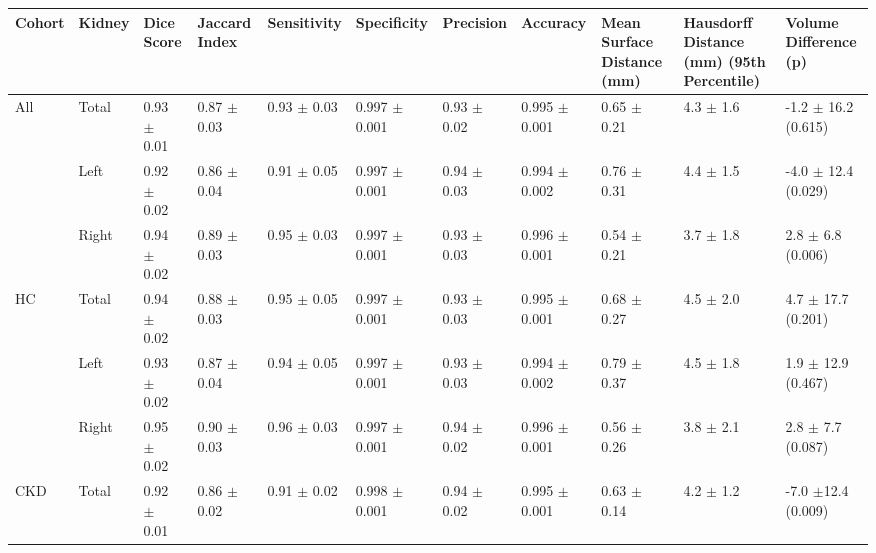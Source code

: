 \begin{landscape}
\begin{table}[H]
	\centering
	\begin{adjustbox}{width=\hsize, center}
	\begin{tabularx}{1.3\hsize}{XX||X|X|X|X|X|X|X|X|X}
		Cohort               & Kidney & Dice   Score  & Jaccard   Index & Sensitivity   & Specificity     & Precision     & Accuracy        & Mean   Surface Distance (mm) & Hausdorff   Distance (mm) (95th Percentile) & Volume   Difference (p)  \\ \hline
		\multirow{3}{*}{All} & Total  & 0.93 $\pm$   0.01 & 0.87 $\pm$   0.03   & 0.93 $\pm$   0.03 & 0.997   $\pm$ 0.001 & 0.93 $\pm$   0.02 & 0.995   $\pm$ 0.001 & 0.65 $\pm$   0.21                & 4.3 $\pm$   1.6                               & -1.2   $\pm$ 16.2 (0.615)  \\ \cline{2-11} 
		& Left   & 0.92 $\pm$ 0.02   & 0.86 $\pm$ 0.04     & 0.91 $\pm$ 0.05   & 0.997 $\pm$ 0.001   & 0.94 $\pm$ 0.03   & 0.994 $\pm$ 0.002   & 0.76 $\pm$ 0.31                  & 4.4 $\pm$ 1.5                                 & -4.0 $\pm$ 12.4   (0.029)  \\ \cline{2-11} 
		& Right  & 0.94 $\pm$   0.02 & 0.89 $\pm$   0.03   & 0.95 $\pm$   0.03 & 0.997   $\pm$ 0.001 & 0.93 $\pm$   0.03 & 0.996   $\pm$ 0.001 & 0.54 $\pm$   0.21                & 3.7 $\pm$   1.8                               & 2.8 $\pm$   6.8 (0.006)    \\ \hline
		\multirow{3}{*}{HC}  & Total  & 0.94 $\pm$ 0.02   & 0.88 $\pm$ 0.03     & 0.95 $\pm$ 0.05   & 0.997 $\pm$ 0.001   & 0.93 $\pm$ 0.03   & 0.995 $\pm$ 0.001   & 0.68 $\pm$ 0.27                  & 4.5 $\pm$ 2.0                                 & 4.7 $\pm$ 17.7 (0.201)     \\ \cline{2-11} 
		& Left   & 0.93 $\pm$   0.02 & 0.87 $\pm$   0.04   & 0.94 $\pm$   0.05 & 0.997   $\pm$ 0.001 & 0.93 $\pm$   0.03 & 0.994   $\pm$ 0.002 & 0.79 $\pm$   0.37                & 4.5 $\pm$   1.8                               & 1.9 $\pm$   12.9 (0.467)   \\ \cline{2-11} 
		& Right  & 0.95 $\pm$ 0.02   & 0.90 $\pm$ 0.03     & 0.96 $\pm$ 0.03   & 0.997 $\pm$ 0.001   & 0.94 $\pm$ 0.02   & 0.996 $\pm$ 0.001   & 0.56 $\pm$ 0.26                  & 3.8 $\pm$ 2.1                                 & 2.8 $\pm$ 7.7   (0.087)    \\ \hline
		\multirow{3}{*}{CKD} & Total  & 0.92 $\pm$   0.01 & 0.86 $\pm$   0.02   & 0.91 $\pm$   0.02 & 0.998   $\pm$ 0.001 & 0.94 $\pm$   0.02 & 0.995   $\pm$ 0.001 & 0.63 $\pm$   0.14                & 4.2 $\pm$   1.2                               & -7.0   $\pm$12.4 (0.009)   \\ \cline{2-11} 

\end{tabularx}
\end{adjustbox}
\end{table}
\end{landscape}

